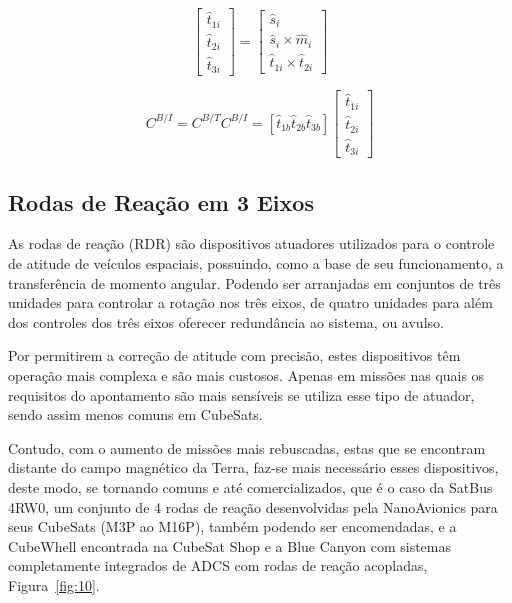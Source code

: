 \begin{equation}
\begin{bmatrix} \hat{t}_{1i} \\ \hat{t}_{2i} \\ \hat{t}_{3i}
\end{bmatrix} = \begin{bmatrix} \hat{s}_i \\  \hat{s}_i\times\hat{m}_i
\\ \hat{t}_{1i}\times\hat{t}_{2i}
\end{bmatrix}
\end{equation}

\begin{equation}
C^{B/I} = C^{B/T}C^{B/I}=\left [\hat{t}_{1b} \hat{t}_{2b} \hat{t}_{3b}  \right ]
\begin{bmatrix} \hat{t}_{1i}\\\hat{t}_{2i}\\\hat{t}_{3i}
\end{bmatrix}
\end{equation}

\subsection{Rodas de Reação em 3 Eixos}\label{sec:3.1.6.1}


As rodas de reação (RDR) são dispositivos atuadores utilizados para o controle de atitude de veículos espaciais, possuindo, como a base de seu funcionamento, a transferência de momento angular. Podendo ser arranjadas em conjuntos de três unidades para controlar a rotação nos três eixos, de quatro unidades para além dos controles dos três eixos oferecer redundância ao sistema, ou avulso.

Por permitirem a correção de atitude com precisão, estes dispositivos têm operação mais complexa e são mais custosos. Apenas em missões nas quais os requisitos do apontamento são mais sensíveis se utiliza esse tipo de atuador, sendo assim menos comuns em CubeSats.

Contudo, com o aumento de missões mais rebuscadas, estas que se encontram distante do campo magnético da Terra, faz-se mais necessário esses dispositivos, deste modo, se tornando comuns e até comercializados, que é o caso da SatBus 4RW0, um conjunto de 4 rodas de reação desenvolvidas pela NanoAvionics para seus CubeSats (M3P ao M16P),  também podendo ser encomendadas, e a CubeWhell encontrada na CubeSat Shop e a Blue Canyon com sistemas completamente integrados de ADCS com rodas de reação acopladas,  Figura~\ref{fig:10}.


